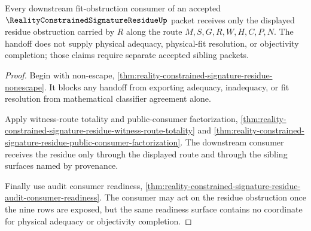 \begin{theorem}
\label{thm:reality-constrained-signature-residue-fit-obstruction-handoff}
Every downstream fit-obstruction consumer of an accepted
$\RealityConstrainedSignatureResidueUp$ packet receives only the displayed
residue obstruction carried by $R$ along the route $M,S,G,R,W,H,C,P,N$. The
handoff does not supply physical adequacy, physical-fit resolution, or
objectivity completion; those claims require separate accepted sibling packets.
\end{theorem}
\begin{proof}
Begin with non-escape,
\autoref{thm:reality-constrained-signature-residue-nonescape}. It blocks any
handoff from exporting adequacy, inadequacy, or fit resolution from mathematical
classifier agreement alone.

Apply witness-route totality and public-consumer factorization,
\autoref{thm:reality-constrained-signature-residue-witness-route-totality} and
\autoref{thm:reality-constrained-signature-residue-public-consumer-factorization}.
The downstream consumer receives the residue only through the displayed route
and through the sibling surfaces named by provenance.

Finally use audit consumer readiness,
\autoref{thm:reality-constrained-signature-residue-audit-consumer-readiness}. The
consumer may act on the residue obstruction once the nine rows are exposed, but
the same readiness surface contains no coordinate for physical adequacy or
objectivity completion.
\end{proof}

